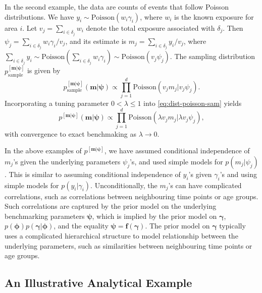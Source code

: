 \documentclass[12pt]{article}
\begin{document}
In the second example, the data are counts of events that follow Poisson distributions.  We have $y_i\sim \text{Poisson}(w_i\gamma_i)$, where $w_i$ is the known exposure for area $i$.  Let $v_j=\sum_{i\in\delta_j}w_i$ denote the total exposure associated with $\delta_j$. Then $\psi_j=\sum_{i\in\delta_j}w_i\gamma_i/v_j$, and its estimate is $m_j=\sum_{i\in\delta_j}y_i/v_j$, where $\sum_{i\in\delta_j}y_i
\sim \text{Poisson}(\sum_{i\in\delta_j}w_i\gamma_i)\sim\text{Poisson}(v_j\psi_j)$. The sampling distribution $p^{[\bm{m}|\bm{\psi}]}_{\text{sample}}$ is given by
\begin{equation}
p^{[\bm{m}|\bm{\psi}]}_{\text{sample}}(\bm{m}|\bm{\psi})\propto \prod_{j=1}^d \text{Poisson}(v_j m_j |  v_j\psi_j). \label{eq:dist-poisson-sam}
\end{equation}
Incorporating a tuning parameter $0 < \lambda \leq 1$ into \eqref{eq:dist-poisson-sam} yields
\begin{equation}
p^{[\bm{m}|\bm{\psi}]}(\bm{m}|\bm{\psi})\propto \prod_{j=1}^d \text{Poisson}(\lambda v_j m_j|  \lambda v_j\psi_j), \label{eq:dist-poisson}
\end{equation}
with convergence to exact benchmaking as $\lambda \rightarrow 0$.

In the above examples of $p^{[\bm{m}|\bm{\psi}]}$, we have assumed conditional independence of $m_j$'s given the underlying parameters $\psi_j$'s, and used simple models for $p(m_j|\psi_j)$.  This is similar to assuming conditional independence of $y_i$'s given $\gamma_i$'s and using simple models for $p(y_i|\gamma_i)$.  Unconditionally, the $m_j$'s can have complicated correlations, such as correlations between neighbouring time points or age groups. Such correlations are captured by the prior model on the underlying benchmarking parameters $\bm{\psi}$, which is implied by the prior model on $\bm{\gamma}$, $p(\bm{\phi})p(\bm{\gamma}|\bm{\phi})$, and the equality $\bm{\psi}=\bm{f}(\bm{\gamma})$.  The prior model on $\bm{\gamma}$ typically uses a complicated hierarchical structure to model relationship between the underlying parameters, such as similarities between neighbouring time points or age groups.

\subsection{An Illustrative Analytical Example}
  \label{sec:anal}
\end{document}
